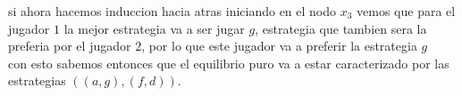 \documentclass[11pt]{article}
\begin{document}
\begin{flushleft}
    si ahora hacemos induccion hacia atras iniciando en el nodo $x_3$ vemos que para el jugador $1$ la mejor
    estrategia va a ser jugar $g$, estrategia que tambien sera la preferia por el jugador $2$, por lo que este jugador va a preferir la estrategia $g$\\
    con esto sabemos entonces que el equilibrio puro va a estar caracterizado por las estrategias $((a,g),(f,d))$.
\end{flushleft}

 
\end{document}
